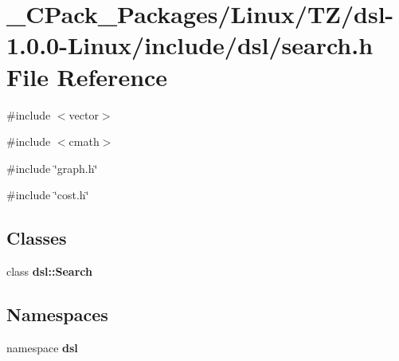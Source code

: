 \section{\_\-CPack\_\-Packages/Linux/TZ/dsl-\/1.0.0-\/Linux/include/dsl/search.h File Reference}
\label{__CPack__Packages_2Linux_2TZ_2dsl-1_80_80-Linux_2include_2dsl_2search_8h}
{\ttfamily \#include $<$vector$>$}\par
{\ttfamily \#include $<$cmath$>$}\par
{\ttfamily \#include \char`\"{}graph.h\char`\"{}}\par
{\ttfamily \#include \char`\"{}cost.h\char`\"{}}\par
\subsection*{Classes}
\begin{DoxyCompactItemize}
\item 
class {\bf dsl::Search}
\end{DoxyCompactItemize}
\subsection*{Namespaces}
\begin{DoxyCompactItemize}
\item 
namespace {\bf dsl}
\end{DoxyCompactItemize}
